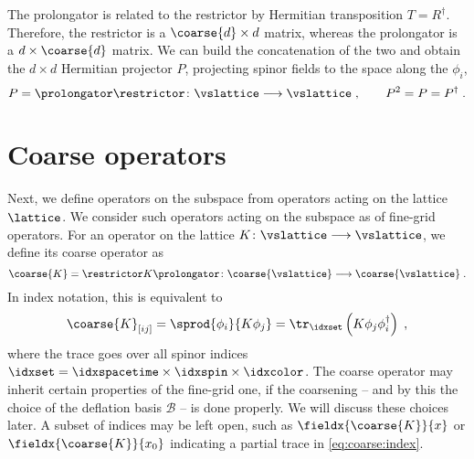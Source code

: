 The prolongator is related to the restrictor by Hermitian transposition $T = R^{\dagger}$.
Therefore, the restrictor is a $\coarse{d} \times d$ matrix, whereas the prolongator is a $d \times \coarse{d}$ matrix.
We can build the concatenation of the two and obtain the $d \times d$ Hermitian projector $P$, projecting spinor fields to the space along the $\phi_{i}$,
\begin{equation} \label{eq:P}
P = \prolongator \restrictor \colon \vslattice \longrightarrow \vslattice \;,
\qquad
P^{2} = P = P^{\dagger} \;.
\end{equation}

\section{Coarse operators}
\label{sec:sd:coarse:ops}

Next, we define operators on the subspace from operators acting on the lattice $\lattice$.
We consider such operators acting on the subspace as  of fine-grid operators.
For an operator on the lattice $K \colon \vslattice \longrightarrow \vslattice$, we define its coarse operator as
\begin{equation} \label{eq:sd:coarse:op}
\coarse{K} = \restrictor K \prolongator \colon \coarse{\vslattice} \longrightarrow \coarse{\vslattice} \;.
\end{equation}
In index notation, this is equivalent to
\begin{equation} \label{eq:coarse:index}
\coarse{K}_{[i j]} =
\sprod{ \phi_{i} }{ K \phi_{j} } =
\tr_{\idxset} \left( K \phi_j \phi_i^\dagger \right) \;,
\end{equation}
where the trace goes over all spinor indices $\idxset = \idxspacetime \times \idxspin \times \idxcolor$.
The coarse operator may inherit certain properties of the fine-grid one, if the coarsening -- and by this the choice of the deflation basis $\mathcal{B}$ --  is done properly.
We will discuss these choices later.
A subset of indices may be left open, such as $\fieldx{\coarse{K}}{x}$ or $\fieldx{\coarse{K}}{x_0}$ indicating a partial trace in \cref{eq:coarse:index}.

